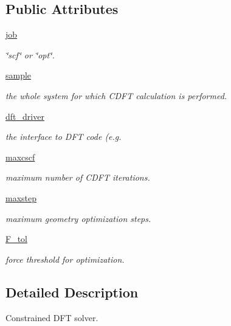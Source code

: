 \subsection*{Public Attributes}
\begin{DoxyCompactItemize}
\item 
\hyperlink{classpycdft_1_1cdft_1_1CDFTSolver_a0dbb216ba260e5fe5ac2d12af5972291}{job}
\begin{DoxyCompactList}\small\item\em \char`\"{}scf\char`\"{} or \char`\"{}opt\char`\"{}. \end{DoxyCompactList}\item 
\hyperlink{classpycdft_1_1cdft_1_1CDFTSolver_a05ea589d1ad333ed95cef64d86408773}{sample}
\begin{DoxyCompactList}\small\item\em the whole system for which C\-D\-F\-T calculation is performed. \end{DoxyCompactList}\item 
\hyperlink{classpycdft_1_1cdft_1_1CDFTSolver_a6fdf43a1aa722ae015cc3338bac8cdbf}{dft\-\_\-driver}
\begin{DoxyCompactList}\small\item\em the interface to D\-F\-T code (e.\-g. \end{DoxyCompactList}\item 
\hyperlink{classpycdft_1_1cdft_1_1CDFTSolver_a4bd78f134669a46d676a557d811949e5}{maxcscf}
\begin{DoxyCompactList}\small\item\em maximum number of C\-D\-F\-T iterations. \end{DoxyCompactList}\item 
\hyperlink{classpycdft_1_1cdft_1_1CDFTSolver_a5faef6c90a36457f9dc4dc7525f8f76a}{maxstep}
\begin{DoxyCompactList}\small\item\em maximum geometry optimization steps. \end{DoxyCompactList}\item 
\hyperlink{classpycdft_1_1cdft_1_1CDFTSolver_a2e23d3524341dfa49edb1c922b7ea76d}{F\-\_\-tol}
\begin{DoxyCompactList}\small\item\em force threshold for optimization. \end{DoxyCompactList}\end{DoxyCompactItemize}


\subsection{Detailed Description}
Constrained D\-F\-T solver. 

